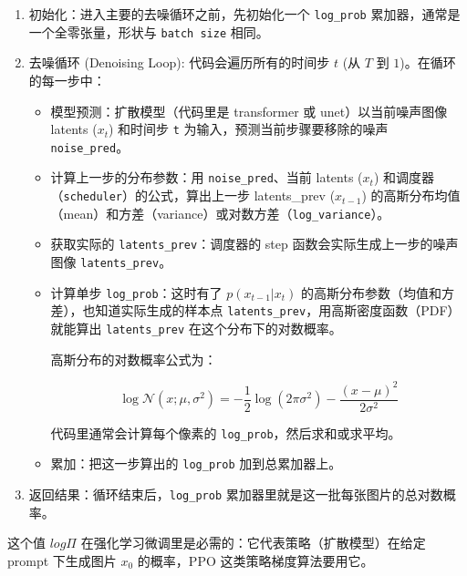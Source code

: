 \begin{enumerate}
  \item 初始化：进入主要的去噪循环之前，先初始化一个 \verb|log_prob| 累加器，通常是一个全零张量，形状与 \verb|batch size| 相同。
  \item 去噪循环 (Denoising Loop): 代码会遍历所有的时间步 \(t\) (从 \(T\) 到 \(1\))。在循环的每一步中：
  
  \begin{itemize}
    \item 模型预测：扩散模型（代码里是 transformer 或 unet）以当前噪声图像 latents (\(x_t\)) 和时间步 \verb|t| 为输入，预测当前步骤要移除的噪声 \verb|noise_pred|。
    \item 计算上一步的分布参数：用 \verb|noise_pred|、当前 latents (\(x_t\)) 和调度器（\verb|scheduler|）的公式，算出上一步 latents\_prev (\(x_{t-1}\)) 的高斯分布均值（mean）和方差（variance）或对数方差（\verb|log_variance|）。
    \item 获取实际的 \verb|latents_prev|：调度器的 step 函数会实际生成上一步的噪声图像 \verb|latents_prev|。
    \item 计算单步 \verb|log_prob|：这时有了 \(p(x_{t-1}|x_t)\) 的高斯分布参数（均值和方差），也知道实际生成的样本点 \verb|latents_prev|，用高斯密度函数（PDF）就能算出 \verb|latents_prev| 在这个分布下的对数概率。
    
    高斯分布的对数概率公式为：
    
    \[
    \log \mathcal{N}(x; \mu, \sigma^2) = -\frac{1}{2} \log(2\pi\sigma^2) - \frac{(x - \mu)^2}{2\sigma^2}
    \]
    
    代码里通常会计算每个像素的 \verb|log_prob|，然后求和或求平均。
    \item 累加：把这一步算出的 \verb|log_prob| 加到总累加器上。
  \end{itemize}
  \item 返回结果：循环结束后，\verb|log_prob| 累加器里就是这一批每张图片的总对数概率。
\end{enumerate}

这个值 \(log \Pi\) 在强化学习微调里是必需的：它代表策略（扩散模型）在给定 prompt 下生成图片 \(x_0\) 的概率，PPO 这类策略梯度算法要用它。
